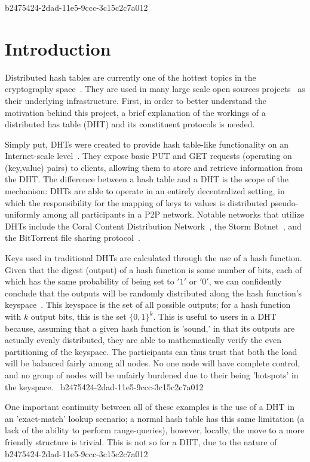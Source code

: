 \documentclass[12pt]{article}
\begin{document}
b2475424-2dad-11e5-9ccc-3c15c2c7a012\section{Introduction}
\par Distributed hash tables are currently one of the hottest topics in the cryptography space~\cite{Stoica:2001dj,Rowstron:2001ea,Ratnasamy:2001wn}. They are used in many large scale open sources projects~\cite{Freitas:2013tb,Xu:2010vs,Perfitt:2010fh} as their underlying infrastructure. First, in order to better understand the motivation behind this project, a brief explanation of the workings of a distributed has table (DHT) and its constituent protocols is needed.

\par Simply put, DHTs were created to provide hash table-like functionality on an Internet-scale level~\cite{Ratnasamy:2001wn}. They expose basic PUT and GET requests (operating on (key,value) pairs) to clients, allowing them to store and retrieve information from the DHT. The difference between a hash table and a DHT is the scope of the mechanism: DHTs are able to operate in an entirely decentralized setting, in which the responsibility for the mapping of keys to values is distributed pseudo-uniformly among all participants in a P2P network. Notable networks that utilize DHTs include the Coral Content Distribution Network~\cite{Freedman:2004vb}, the Storm Botnet~\cite{Holz:2008uk}, and the BitTorrent file sharing protocol~\cite{Cohen:y1_8mBnw}.

\par Keys used in traditional DHTs are calculated through the use of a hash function. Given that the digest (output) of a hash function is some number of bits, each of which has the same probability of being set to $'1'$ or $'0'$, we can confidently conclude that the outputs will be randomly distributed along the hash function's keyspace~. This keyspace is the set of all possible outputs; for a hash function with $k$ output bits, this is the set $\{0,1\}^k$. This is useful to users in a DHT because, assuming that a given hash function is 'sound,' in that its outputs are actually evenly distributed, they are able to mathematically verify the even partitioning of the keyspace. The participants can thus trust that both the load will be balanced fairly among all nodes. No one node will have complete control, and no group of nodes will be unfairly burdened due to their being 'hotspots' in the keyspace.~
b2475424-2dad-11e5-9ccc-3c15c2c7a012
\par One important continuity between all of these examples is the use of a DHT in an 'exact-match' lookup scenario; a normal hash table has this same limitation (a lack of the ability to perform range-queries), however, locally, the move to a more friendly structure is trivial. This is not so for a DHT, due to the nature of
b2475424-2dad-11e5-9ccc-3c15c2c7a012\printbibliography
\end{document}
